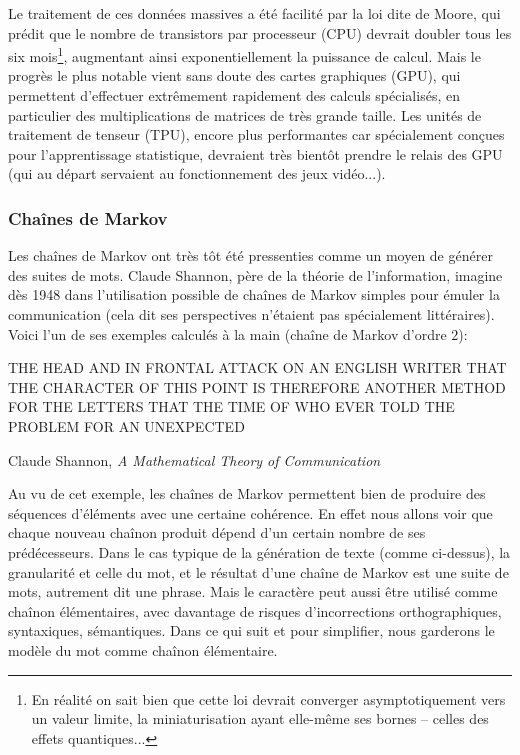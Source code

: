 \documentclass{article}
\newenvironment{citationbox}
{\begin{center}
		\begin{minipage}{.8\textwidth}
		}
		{
		\end{minipage}	
\end{center}
}
\begin{document}
			Le traitement de ces données massives a été facilité par la loi dite de Moore, qui prédit que le nombre de transistors par processeur (CPU) devrait doubler tous les six mois\footnote{En réalité on sait bien que cette loi devrait converger asymptotiquement vers un valeur limite, la miniaturisation ayant elle-même ses bornes -- celles des effets quantiques...}, augmentant ainsi exponentiellement la puissance de calcul. Mais le progrès le plus notable vient sans doute des cartes graphiques (GPU), qui permettent d'effectuer extrêmement rapidement des calculs spécialisés, en particulier des multiplications de matrices de très grande taille. Les unités de traitement de tenseur (TPU), encore plus performantes car spécialement conçues pour l'apprentissage statistique, devraient très bientôt prendre le relais des GPU (qui au départ servaient au fonctionnement des jeux vidéo...).
			\subsubsection{Chaînes de Markov}\label{markov}
				Les chaînes de Markov ont très tôt été pressenties comme un moyen de générer des suites de mots. Claude Shannon, père de la théorie de l'information, imagine dès 1948 dans \autocite{shannon1948} l'utilisation possible de chaînes de Markov simples pour émuler la communication (cela dit ses perspectives n'étaient pas spécialement littéraires). Voici l'un de ses exemples calculés à la main (chaîne de Markov d'ordre $2$):
				\begin{citationbox}
					THE HEAD AND IN FRONTAL ATTACK ON AN ENGLISH WRITER THAT THE CHARACTER OF THIS POINT IS THEREFORE ANOTHER METHOD FOR THE LETTERS THAT THE TIME OF WHO EVER TOLD THE PROBLEM FOR AN UNEXPECTED
					\begin{flushright}
						Claude Shannon, \textit{A Mathematical Theory of Communication} \autocite{shannon1948}
					\end{flushright}
				\end{citationbox}
				Au vu de cet exemple, les chaînes de Markov permettent bien de produire des séquences d'éléments avec une certaine cohérence. En effet nous allons voir que chaque nouveau chaînon produit dépend d'un certain nombre de ses prédécesseurs. Dans le cas typique de la génération de texte (comme ci-dessus), la granularité et celle du mot, et le résultat d'une chaîne de Markov est une suite de mots, autrement dit une phrase. Mais le caractère peut aussi être utilisé comme chaînon élémentaires, avec davantage de risques d'incorrections orthographiques, syntaxiques, sémantiques. Dans ce qui suit et pour simplifier, nous garderons le modèle du mot comme chaînon élémentaire.\\
				
\end{document}
